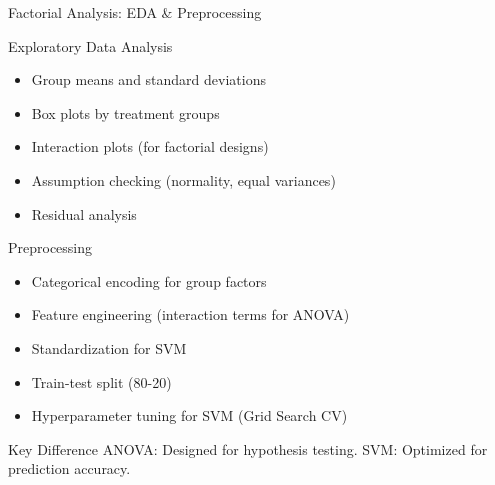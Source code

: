 \documentclass[aspectratio=169,10pt]{beamer}
\begin{document}
\begin{frame}{Factorial Analysis: EDA \& Preprocessing}
\begin{block}{Exploratory Data Analysis}
\begin{itemize}
    \item Group means and standard deviations
    \item Box plots by treatment groups
    \item Interaction plots (for factorial designs)
    \item Assumption checking (normality, equal variances)
    \item Residual analysis
\end{itemize}
\end{block}

\vspace{0.3cm}

\begin{block}{Preprocessing}
\begin{itemize}
    \item Categorical encoding for group factors
    \item Feature engineering (interaction terms for ANOVA)
    \item Standardization for SVM
    \item Train-test split (80-20)
    \item Hyperparameter tuning for SVM (Grid Search CV)
\end{itemize}
\end{block}

\vspace{0.3cm}

\begin{alertblock}{Key Difference}
ANOVA: Designed for hypothesis testing. SVM: Optimized for prediction accuracy.
\end{alertblock}
\end{frame}
\end{document}
